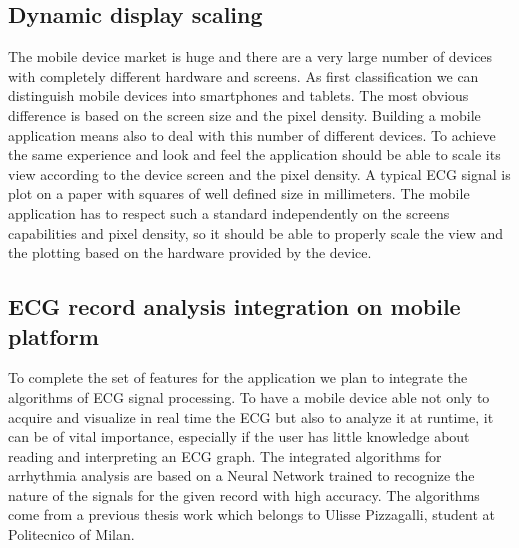 \subsection{Dynamic display scaling}
The mobile device market is huge and there are a very large number of devices with completely different hardware and screens. As first classification we can distinguish mobile devices into smartphones and tablets. The most obvious difference is based on the screen size and the pixel density. Building a mobile application means also to deal with this number of different devices. To achieve the same experience and look and feel the application should be able to scale its view according to the device screen and the pixel density. A typical ECG signal is plot on a paper with squares of well defined size in millimeters. The mobile application has to respect such a standard independently on the screens capabilities and pixel density, so it should be able to properly scale the view and the plotting based on the hardware provided by the device.

\subsection{ECG record analysis integration on mobile platform}
To complete the set of features for the application we plan to integrate the algorithms of ECG signal processing. To have a mobile device able not only to acquire and visualize in real time the ECG but also to analyze it at runtime, it can be of vital importance, especially if the user has little knowledge about reading and interpreting an ECG graph. The integrated algorithms for arrhythmia analysis are based on a Neural Network trained to recognize the nature of the signals for the given record with high accuracy. The algorithms come from a previous thesis work\cite{ref3} which belongs to Ulisse Pizzagalli, student at Politecnico of Milan.

